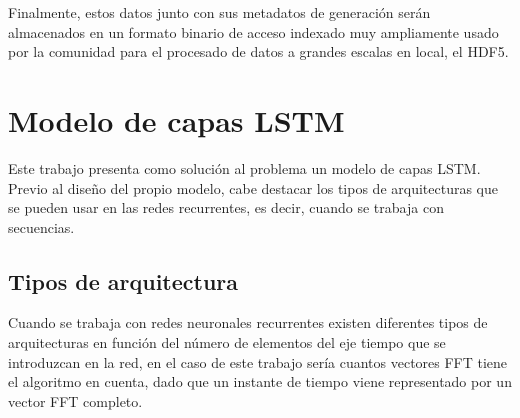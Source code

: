 Finalmente, estos datos junto con sus metadatos de generación serán almacenados en un formato binario de acceso indexado muy ampliamente usado por la comunidad para el procesado de datos a grandes escalas en local, el \gls{HDF5}.

\section{Modelo de capas \acrshort{LSTM}}
Este trabajo presenta como solución al problema un modelo de capas \gls{LSTM}. Previo al diseño del propio modelo, cabe destacar los tipos de arquitecturas que se pueden usar en las redes recurrentes, es decir, cuando se trabaja con secuencias.
\subsection{Tipos de arquitectura}
Cuando se trabaja con redes neuronales recurrentes existen diferentes tipos de arquitecturas en función del número de elementos del eje tiempo que se introduzcan en la red, en el caso de este trabajo sería cuantos vectores \gls{FFT} tiene el algoritmo en cuenta, dado que un instante de tiempo viene representado por un vector \gls{FFT} completo.

